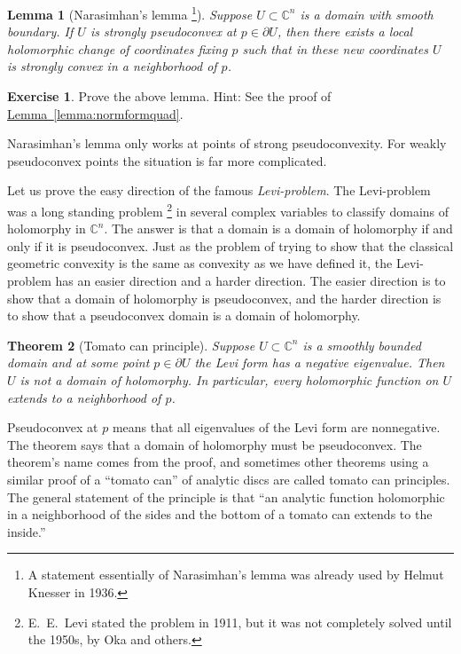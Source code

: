 \documentclass[12pt,openany]{book}
\newcommand{\C}{{\mathbb{C}}}
\newcommand{\myindex}[1]{#1\index{#1}}
\theoremstyle{plain}
\newtheorem{thm}{Theorem}[section]
\newtheorem{lemma}[thm]{Lemma}
\theoremstyle{remark}
\theoremstyle{definition}
\newenvironment{exbox}{%
    \def\FrameCommand{\vrule width 1pt \relax\hspace {10pt}}%
    \MakeFramed {\advance \hsize -\width \FrameRestore }%
}{%
    \endMakeFramed
}
\theoremstyle{exercise}
\newtheorem{exercise}{Exercise}[section]
\theoremstyle{example}
\newcommand{\lemmaref}[1]{\hyperref[#1]{Lemma~\ref*{#1}}}
\begin{document}
\begin{lemma}[Narasimhan's lemma%
\footnote{A statement essentially of Narasimhan's lemma was already used by Helmut
Knesser in 1936.}]
Suppose $U \subset \C^n$ is a domain with smooth boundary.
If $U$ is strongly
pseudoconvex at $p \in \partial U$, then there exists a local holomorphic change of
coordinates fixing $p$ such that in these new coordinates $U$ is strongly convex in a neighborhood of $p$.
\end{lemma}

\begin{exbox}
\begin{exercise}
Prove the above lemma.  Hint: See the proof of \lemmaref{lemma:normformquad}.
\end{exercise}
\end{exbox}

Narasimhan's lemma only works at points of strong
pseudoconvexity.  For weakly pseudoconvex points the situation is far more
complicated.

\medskip


Let us prove the easy direction of the famous 
\emph{\myindex{Levi-problem}}.  The Levi-problem was a long standing
problem%
\footnote{E.\ E.\ Levi stated the problem in 1911, but it was not completely
solved until the 1950s, by Oka and others.}
in several complex variables to classify domains of holomorphy in
$\C^n$.  The answer is that a domain is a domain of holomorphy if and only
if it is pseudoconvex.  Just as the problem of trying to show that
the classical geometric convexity is the same as convexity as we have
defined it, 
the Levi-problem has an easier direction and a harder direction.
The easier direction is to show that a domain of holomorphy is pseudoconvex, and
the harder direction is to show that a pseudoconvex domain is a domain of
holomorphy.

\begin{thm}[Tomato can principle] \label{thm:tomatocan}
Suppose
$U \subset \C^n$ is a smoothly bounded domain and at some point $p \in
\partial U$ the Levi form has a negative eigenvalue.
Then $U$ is not
a domain of holomorphy.  In particular, every holomorphic function on $U$
extends to a neighborhood of $p$.
\end{thm}

Pseudoconvex at $p$ means that all eigenvalues of the Levi form are
nonnegative.
The theorem says that a domain of holomorphy must be pseudoconvex.
The theorem's name comes from the proof, and sometimes other theorems using a
similar proof of a ``tomato can'' of analytic discs are called
tomato can principles.
The general statement of the principle is that ``an
analytic function holomorphic in a neighborhood of the sides and the bottom
of a tomato can extends to the inside.''
\end{document}
